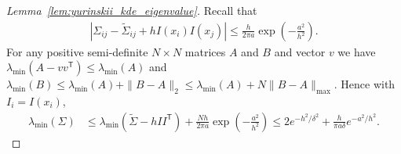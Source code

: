\documentclass[11pt,lof]{puthesis}
\newcommand{\T}{\ensuremath{\mathsf{T}}}
\theoremstyle{break}
\theoremstyle{proof}
\newtheorem{proof}{Proof}
\begin{document}
\begin{proof}[Lemma~\ref{lem:yurinskii_kde_eigenvalue}]
Recall that
%
\begin{align*}
\left|
\Sigma_{i j}
- \tilde\Sigma_{i j}
+ h I(x_i) I(x_j)
\right|
\leq
\frac{h}{2 \pi a}
\exp \left(- \frac{a^2}{h^2}\right).
\end{align*}
%
For any positive semi-definite $N \times N$ matrices $A$ and $B$
and vector $v$ we have $\lambda_{\min}(A - v v^\T) \leq \lambda_{\min}(A)$
and $\lambda_{\min}(B) \leq \lambda_{\min}(A) + \|B-A\|_2
\leq \lambda_{\min}(A) + N \|B-A\|_{\max}$.
Hence with $I_i = I(x_i)$,
%
\begin{align*}
\lambda_{\min}(\Sigma)
&\leq
\lambda_{\min}(\tilde\Sigma - h I I^\T)
+ \frac{N h}{2 \pi a}
\exp \left(- \frac{a^2}{h^2}\right)
\leq
2 e^{-h^2/\delta^2}
+ \frac{h}{\pi a \delta}
e^{-a^2 / h^2}.
\end{align*}
\end{proof}
\end{document}
